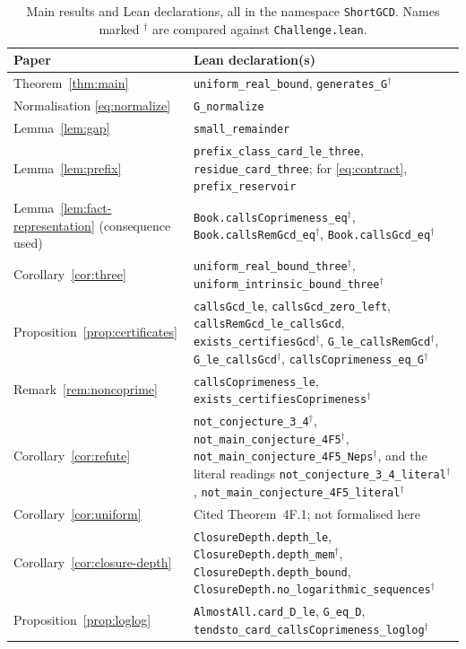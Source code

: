 \documentclass[11pt]{article}
\theoremstyle{remark}
\newcommand{\lean}[1]{\nolinkurl{#1}}
\begin{document}
\begin{table}[!h]
\centering\small
\caption{Main results and Lean declarations, all in the namespace \texttt{ShortGCD}. Names marked ${}^\dagger$ are compared against \texttt{Challenge.lean}.}
\label{tab:lean}
\begin{tabular}{@{}>{\raggedright\arraybackslash}p{}>{\raggedright\arraybackslash}p{}@{}}
\toprule
Paper & Lean declaration(s)\\\midrule
Theorem~\ref{thm:main} & \lean{uniform_real_bound}, \lean{generates_G}${}^\dagger$\\
Normalisation \eqref{eq:normalize} & \lean{G_normalize}\\
Lemma~\ref{lem:gap} & \lean{small_remainder}\\
Lemma~\ref{lem:prefix} & \lean{prefix_class_card_le_three}, \lean{residue_card_three}; for \eqref{eq:contract}, \lean{prefix_reservoir}\\
Lemma~\ref{lem:fact-representation} (consequence used) & \lean{Book.callsCoprimeness_eq}${}^\dagger$,
\lean{Book.callsRemGcd_eq}${}^\dagger$, \lean{Book.callsGcd_eq}${}^\dagger$\\
Corollary~\ref{cor:three} & \lean{uniform_real_bound_three}${}^\dagger$, \lean{uniform_intrinsic_bound_three}${}^\dagger$\\
Proposition~\ref{prop:certificates} &
\lean{callsGcd_le}, \lean{callsGcd_zero_left}, \lean{callsRemGcd_le_callsGcd},
\lean{exists_certifiesGcd}${}^\dagger$, \lean{G_le_callsRemGcd}${}^\dagger$,
\lean{G_le_callsGcd}${}^\dagger$, \lean{callsCoprimeness_eq_G}${}^\dagger$\\
Remark~\ref{rem:noncoprime} & \lean{callsCoprimeness_le}, \lean{exists_certifiesCoprimeness}${}^\dagger$\\
Corollary~\ref{cor:refute} &
\lean{not_conjecture_3_4}${}^\dagger$, \lean{not_main_conjecture_4F5}${}^\dagger$,
\lean{not_main_conjecture_4F5_Neps}${}^\dagger$, and the literal readings
\lean{not_conjecture_3_4_literal}${}^\dagger$,
\lean{not_main_conjecture_4F5_literal}${}^\dagger$\\
Corollary~\ref{cor:uniform} & Cited Theorem~4F.1; not formalised here\\
Corollary~\ref{cor:closure-depth} & \lean{ClosureDepth.depth_le}, \lean{ClosureDepth.depth_mem}${}^\dagger$,
\lean{ClosureDepth.depth_bound}, \lean{ClosureDepth.no_logarithmic_sequences}${}^\dagger$\\
Proposition~\ref{prop:loglog} & \lean{AlmostAll.card_D_le}, \lean{G_eq_D},
\lean{tendsto_card_callsCoprimeness_loglog}${}^\dagger$\\

\end{tabular}
\end{table}
\end{document}
